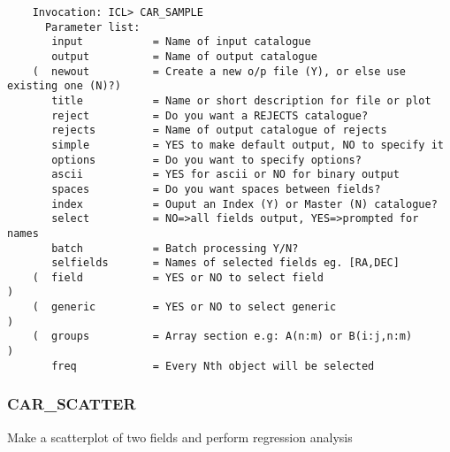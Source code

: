 \begin{verbatim}
    Invocation: ICL> CAR_SAMPLE
      Parameter list:
       input           = Name of input catalogue
       output          = Name of output catalogue
    (  newout          = Create a new o/p file (Y), or else use existing one (N)?)
       title           = Name or short description for file or plot
       reject          = Do you want a REJECTS catalogue?
       rejects         = Name of output catalogue of rejects
       simple          = YES to make default output, NO to specify it
       options         = Do you want to specify options?
       ascii           = YES for ascii or NO for binary output
       spaces          = Do you want spaces between fields?
       index           = Ouput an Index (Y) or Master (N) catalogue?
       select          = NO=>all fields output, YES=>prompted for names
       batch           = Batch processing Y/N?
       selfields       = Names of selected fields eg. [RA,DEC]
    (  field           = YES or NO to select field                               )
    (  generic         = YES or NO to select generic                             )
    (  groups          = Array section e.g: A(n:m) or B(i:j,n:m)                 )
       freq            = Every Nth object will be selected
\end{verbatim}

\subsubsection{CAR\_SCATTER}
 
Make a scatterplot of two fields and perform regression analysis

